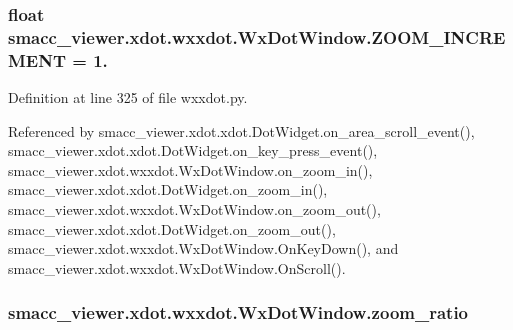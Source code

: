 \subsubsection[{\texorpdfstring{Z\+O\+O\+M\+\_\+\+I\+N\+C\+R\+E\+M\+E\+NT}{ZOOM_INCREMENT}}]{\setlength{\rightskip}{0pt plus 5cm}float smacc\+\_\+viewer.\+xdot.\+wxxdot.\+Wx\+Dot\+Window.\+Z\+O\+O\+M\+\_\+\+I\+N\+C\+R\+E\+M\+E\+NT = 1.\hspace{0.3cm}{\ttfamily [static]}}\hypertarget{classsmacc__viewer_1_1xdot_1_1wxxdot_1_1WxDotWindow_a392efaff1fd3a898dda28aeb26fceeb5}{}\label{classsmacc__viewer_1_1xdot_1_1wxxdot_1_1WxDotWindow_a392efaff1fd3a898dda28aeb26fceeb5}


Definition at line 325 of file wxxdot.\+py.



Referenced by smacc\+\_\+viewer.\+xdot.\+xdot.\+Dot\+Widget.\+on\+\_\+area\+\_\+scroll\+\_\+event(), smacc\+\_\+viewer.\+xdot.\+xdot.\+Dot\+Widget.\+on\+\_\+key\+\_\+press\+\_\+event(), smacc\+\_\+viewer.\+xdot.\+wxxdot.\+Wx\+Dot\+Window.\+on\+\_\+zoom\+\_\+in(), smacc\+\_\+viewer.\+xdot.\+xdot.\+Dot\+Widget.\+on\+\_\+zoom\+\_\+in(), smacc\+\_\+viewer.\+xdot.\+wxxdot.\+Wx\+Dot\+Window.\+on\+\_\+zoom\+\_\+out(), smacc\+\_\+viewer.\+xdot.\+xdot.\+Dot\+Widget.\+on\+\_\+zoom\+\_\+out(), smacc\+\_\+viewer.\+xdot.\+wxxdot.\+Wx\+Dot\+Window.\+On\+Key\+Down(), and smacc\+\_\+viewer.\+xdot.\+wxxdot.\+Wx\+Dot\+Window.\+On\+Scroll().

\subsubsection[{\texorpdfstring{zoom\+\_\+ratio}{zoom_ratio}}]{\setlength{\rightskip}{0pt plus 5cm}smacc\+\_\+viewer.\+xdot.\+wxxdot.\+Wx\+Dot\+Window.\+zoom\+\_\+ratio}\hypertarget{classsmacc__viewer_1_1xdot_1_1wxxdot_1_1WxDotWindow_ab53373bad50bdff06f2b31afa577fca2}{}\label{classsmacc__viewer_1_1xdot_1_1wxxdot_1_1WxDotWindow_ab53373bad50bdff06f2b31afa577fca2}


